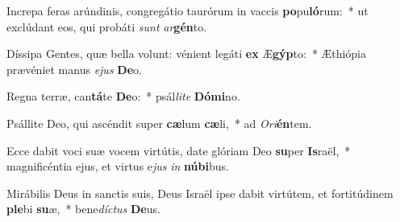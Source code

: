 \item Increpa feras arúndinis, congregátio taurórum in vaccis \textbf{po}pu\textbf{ló}rum:~* ut exclúdant eos, qui probáti \textit{sunt} \textit{ar}\textbf{gén}to.
\item Díssipa Gentes, quæ bella volunt: vénient legáti \textbf{ex} Æ\textbf{gýp}to:~* Æthiópia prævéniet manus \textit{e}\textit{jus} \textbf{De}o.
\item Regna terræ, can\textbf{tá}te \textbf{De}o:~* psál\textit{li}\textit{te} \textbf{Dó}\textbf{mi}no.
\item Psállite Deo, qui ascéndit super \textbf{cæ}lum \textbf{cæ}li,~* ad \textit{O}\textit{ri}\textbf{én}tem.
\item Ecce dabit voci suæ vocem virtútis, date glóriam Deo \textbf{su}per \textbf{Is}raël,~* magnificéntia ejus, et virtus e\textit{jus} \textit{in} \textbf{nú}\textbf{bi}bus.
\item Mirábilis Deus in sanctis suis, Deus Israël ipse dabit virtútem, et fortitúdinem \textbf{ple}bi \textbf{su}æ,~* bene\textit{díc}\textit{tus} \textbf{De}us.
